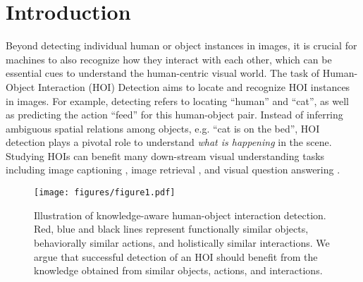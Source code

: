 \documentclass[sigconf,screen]{acmart}
\begin{document}


\maketitle



\section{Introduction}

Beyond detecting individual human or object instances in images, it is crucial for machines to also recognize how they interact with each other, which can be essential cues to understand the human-centric visual world. The task of Human-Object Interaction (HOI) Detection aims to locate and recognize HOI instances in images. For example, detecting  refers to locating ``human'' and ``cat'', as well as predicting the action ``feed'' for this human-object pair. Instead of inferring ambiguous spatial relations among objects, e.g. ``cat is on the bed'', HOI detection plays a pivotal role to understand \textit{what is happening} in the scene. Studying HOIs can benefit many down-stream visual understanding tasks including image captioning \cite{li2017scene}, image retrieval \cite{xu2017scene}, and visual question answering \cite{goyal2017making}.

\begin{figure}
\centering
\texttt{[image: figures/figure1.pdf]}
\caption{Illustration of knowledge-aware human-object interaction detection. Red, blue and black lines represent functionally similar objects, behaviorally similar actions, and holistically similar interactions. We argue that successful detection of an HOI should benefit from the knowledge obtained from similar objects, actions, and interactions.}
\label{fig1}
\end{figure}
\end{document}
